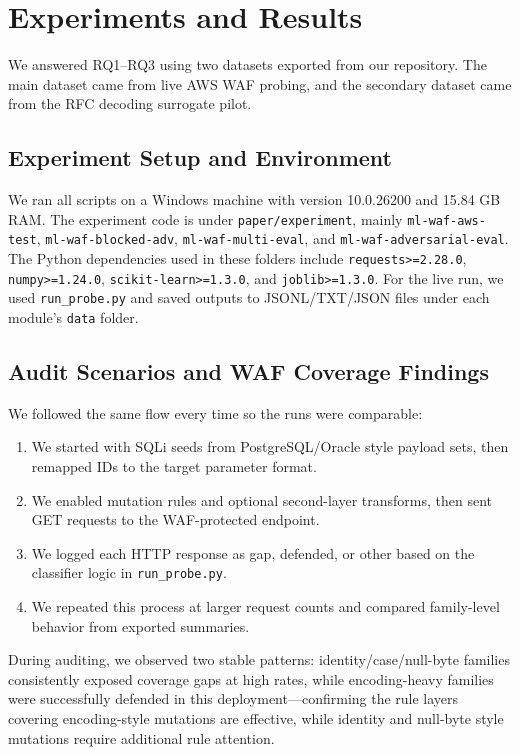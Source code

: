 \section{Experiments and Results}
\label{sec:experiments}
We answered RQ1--RQ3 using two datasets exported from our repository. The main dataset came from live AWS WAF probing, and the secondary dataset came from the RFC decoding surrogate pilot.

\subsection{Experiment Setup and Environment}
We ran all scripts on a Windows machine with version 10.0.26200 and 15.84 GB RAM. The experiment code is under \texttt{paper/experiment}, mainly \texttt{ml-waf-aws-test}, \texttt{ml-waf-blocked-adv}, \texttt{ml-waf-multi-eval}, and \texttt{ml-waf-adversarial-eval}. The Python dependencies used in these folders include \texttt{requests>=2.28.0}, \texttt{numpy>=1.24.0}, \texttt{scikit-learn>=1.3.0}, and \texttt{joblib>=1.3.0}. For the live run, we used \texttt{run\_probe.py} and saved outputs to JSONL/TXT/JSON files under each module's \texttt{data} folder.

\subsection{Audit Scenarios and WAF Coverage Findings}
We followed the same flow every time so the runs were comparable:
\begin{enumerate}
  \item We started with SQLi seeds from PostgreSQL/Oracle style payload sets, then remapped IDs to the target parameter format.
  \item We enabled mutation rules and optional second-layer transforms, then sent GET requests to the WAF-protected endpoint.
  \item We logged each HTTP response as \textsf{gap}, \textsf{defended}, or \textsf{other} based on the classifier logic in \texttt{run\_probe.py}.
  \item We repeated this process at larger request counts and compared family-level behavior from exported summaries.
\end{enumerate}
During auditing, we observed two stable patterns: identity/case/null-byte families consistently exposed coverage gaps at high rates, while encoding-heavy families were successfully defended in this deployment---confirming the rule layers covering encoding-style mutations are effective, while identity and null-byte style mutations require additional rule attention.

